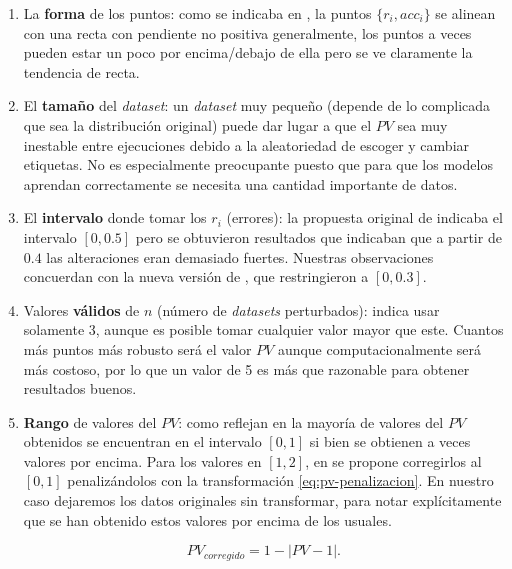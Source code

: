 \begin{enumerate}
  \item La \textbf{forma} de los puntos: como se indicaba en \cite{zhang2019perturbation}, la puntos $\{r_i, acc_i\}$ se alinean con una recta con pendiente no positiva generalmente, los puntos a veces pueden estar un poco por encima/debajo de ella pero se ve claramente la tendencia de recta.

  \item El \textbf{tamaño} del \emph{dataset}: un \emph{dataset} muy pequeño (depende de lo complicada que sea la distribución original) puede dar lugar a que el $PV$ sea muy inestable entre ejecuciones debido a la aleatoriedad de escoger y cambiar etiquetas. No es especialmente preocupante puesto que para que los modelos aprendan correctamente se necesita una cantidad importante de datos.

  \item El \textbf{intervalo} donde tomar los $r_i$ (errores): la propuesta original de \cite{zhang2019perturbation} indicaba el intervalo $[0, 0.5]$ pero se obtuvieron resultados que indicaban que a partir de $0.4$ las alteraciones eran demasiado fuertes. Nuestras observaciones concuerdan con la nueva versión de \cite{zhang2019perturbation}, que restringieron a $[0, 0.3]$.

  \item Valores \textbf{válidos} de $n$ (número de \emph{datasets} perturbados): \cite{zhang2019perturbation} indica usar solamente 3, aunque es posible tomar cualquier valor mayor que este. Cuantos más puntos más robusto será el valor $PV$ aunque computacionalmente será más costoso, por lo que un valor de 5 es más que razonable para obtener resultados buenos.

  \item \textbf{Rango} de valores del $PV$: como reflejan en \cite{zhang2019perturbation} la mayoría de valores del $PV$ obtenidos se encuentran en el intervalo $[0, 1]$ si bien se obtienen a veces valores por encima. Para los valores en $[1, 2]$, en \cite{zhang2019perturbation} se propone corregirlos al $[0, 1]$ penalizándolos con la   transformación \eqref{eq:pv-penalizacion}. En nuestro caso dejaremos los datos originales sin transformar, para notar explícitamente que se han obtenido estos valores por encima de los usuales.

  \begin{equation}
    PV_{corregido} = 1 - |PV - 1|.
    \label{eq:pv-penalizacion}
  \end{equation}


\end{enumerate}
